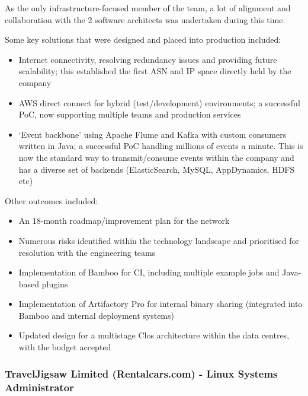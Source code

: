 As the only infrastructure-focused member of the team, a lot of
alignment and collaboration with the 2 software architects was
undertaken during this time.

Some key solutions that were designed and placed into production
included:

\begin{itemize}
\tightlist
\item
  Internet connectivity, resolving redundancy issues and providing
  future scalability; this established the first ASN and IP space
  directly held by the company
\item
  AWS direct connect for hybrid (test/development) environments; a
  successful PoC, now supporting multiple teams and production services
\item
  `Event backbone' using Apache Flume and Kafka with custom consumers
  written in Java; a successful PoC handling millions of events a
  minute. This is now the standard way to transmit/consume events within
  the company and has a diverse set of backends (ElasticSearch, MySQL,
  AppDynamics, HDFS etc)
\end{itemize}

Other outcomes included:

\begin{itemize}
\tightlist
\item
  An 18-month roadmap/improvement plan for the network
\item
  Numerous risks identified within the technology landscape and
  prioritised for resolution with the engineering teams
\item
  Implementation of Bamboo for CI, including multiple example jobs and
  Java-based plugins
\item
  Implementation of Artifactory Pro for internal binary sharing
  (integrated into Bamboo and internal deployment systems)
\item
  Updated design for a multistage Clos architecture within the data
  centres, with the budget accepted
\end{itemize}

\hypertarget{traveljigsaw-limited-rentalcars.com---linux-systems-administrator}{%
\subsubsection{TravelJigsaw Limited (Rentalcars.com) - Linux Systems
Administrator}\label{traveljigsaw-limited-rentalcars.com---linux-systems-administrator}}

